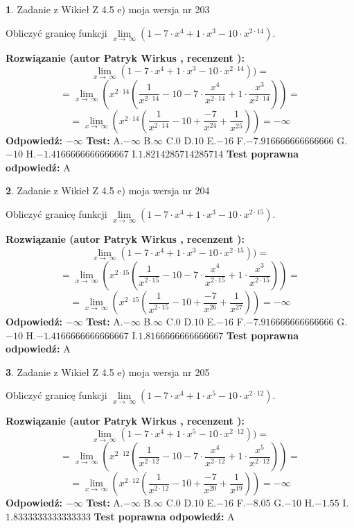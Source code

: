 \documentclass[12pt, a4paper]{article}
\theoremstyle{definition} %
\newtheorem{zad}{}
\newcommand{\zadStart}[1]{\begin{zad}#1\newline}
\newcommand{\zadStop}{\end{zad}}
\newcommand{\rozwStart}[2]{\noindent \textbf{Rozwiązanie (autor #1 , recenzent #2): }\newline}
\newcommand{\rozwStop}{\newline}
\newcommand{\odpStart}{\noindent \textbf{Odpowiedź:}\newline}
\newcommand{\odpStop}{\newline}
\newcommand{\testStart}{\noindent \textbf{Test:}\newline}
\newcommand{\testStop}{\newline}
\newcommand{\kluczStart}{\noindent \textbf{Test poprawna odpowiedź:}\newline}
\newcommand{\kluczStop}{\newline}
\begin{document}
\zadStart{Zadanie z Wikieł Z 4.5 e) moja wersja nr 203}


Obliczyć granicę funkcji  $\lim\limits_{x\to\ \infty}(1 - 7 \cdot x^{4}+1 \cdot x^{3}- 10 \cdot x^{2\cdot14})$.
\zadStop
\rozwStart{Patryk Wirkus}{}
$$\lim\limits_{x\to\ \infty}(1 - 7 \cdot x^{4}+1 \cdot x^{3}- 10 \cdot x^{2\cdot14}))=$$
$$=\lim\limits_{x\to\ \infty}(x^{2\cdot14}(\frac{1}{x^{2\cdot14}}-10 -7 \cdot \frac{x^{4}}{x^{2\cdot14}}+1 \cdot \frac{x^{3}}{x^{2\cdot14}}))=$$
$$=\lim\limits_{x\to\ \infty}(x^{2\cdot14}(\frac{1}{x^{2\cdot14}}-10 + \frac{-7}{x^{24}}+ \frac{1}{x^{25}}))=-\infty$$
\rozwStop
\odpStart
$-\infty$
\odpStop
\testStart
A.$-\infty$ B.$\infty$ C.$0$ D.$10$ E.$-16$
F.$-7.916666666666666$ G.$-10$
H.$-1.4166666666666667$
I.$1.8214285714285714$
\testStop
\kluczStart
A
\kluczStop



\zadStart{Zadanie z Wikieł Z 4.5 e) moja wersja nr 204}


Obliczyć granicę funkcji  $\lim\limits_{x\to\ \infty}(1 - 7 \cdot x^{4}+1 \cdot x^{3}- 10 \cdot x^{2\cdot15})$.
\zadStop
\rozwStart{Patryk Wirkus}{}
$$\lim\limits_{x\to\ \infty}(1 - 7 \cdot x^{4}+1 \cdot x^{3}- 10 \cdot x^{2\cdot15}))=$$
$$=\lim\limits_{x\to\ \infty}(x^{2\cdot15}(\frac{1}{x^{2\cdot15}}-10 -7 \cdot \frac{x^{4}}{x^{2\cdot15}}+1 \cdot \frac{x^{3}}{x^{2\cdot15}}))=$$
$$=\lim\limits_{x\to\ \infty}(x^{2\cdot15}(\frac{1}{x^{2\cdot15}}-10 + \frac{-7}{x^{26}}+ \frac{1}{x^{27}}))=-\infty$$
\rozwStop
\odpStart
$-\infty$
\odpStop
\testStart
A.$-\infty$ B.$\infty$ C.$0$ D.$10$ E.$-16$
F.$-7.916666666666666$ G.$-10$
H.$-1.4166666666666667$
I.$1.8166666666666667$
\testStop
\kluczStart
A
\kluczStop



\zadStart{Zadanie z Wikieł Z 4.5 e) moja wersja nr 205}


Obliczyć granicę funkcji  $\lim\limits_{x\to\ \infty}(1 - 7 \cdot x^{4}+1 \cdot x^{5}- 10 \cdot x^{2\cdot12})$.
\zadStop
\rozwStart{Patryk Wirkus}{}
$$\lim\limits_{x\to\ \infty}(1 - 7 \cdot x^{4}+1 \cdot x^{5}- 10 \cdot x^{2\cdot12}))=$$
$$=\lim\limits_{x\to\ \infty}(x^{2\cdot12}(\frac{1}{x^{2\cdot12}}-10 -7 \cdot \frac{x^{4}}{x^{2\cdot12}}+1 \cdot \frac{x^{5}}{x^{2\cdot12}}))=$$
$$=\lim\limits_{x\to\ \infty}(x^{2\cdot12}(\frac{1}{x^{2\cdot12}}-10 + \frac{-7}{x^{20}}+ \frac{1}{x^{19}}))=-\infty$$
\rozwStop
\odpStart
$-\infty$
\odpStop
\testStart
A.$-\infty$ B.$\infty$ C.$0$ D.$10$ E.$-16$
F.$-8.05$ G.$-10$
H.$-1.55$
I.$1.8333333333333333$
\testStop
\kluczStart
A
\kluczStop
\end{document}
